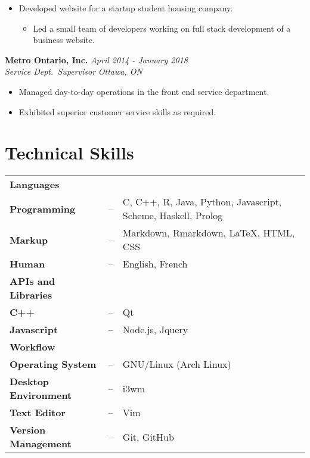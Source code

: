 \documentclass[]{article}
\providecommand{\tightlist}{%
  \setlength{\itemsep}{0pt}\setlength{\parskip}{0pt}}
\begin{document}
\begin{itemize}
\tightlist
\item
  Developed website for a startup student housing company.

  \begin{itemize}
  \tightlist
  \item
    Led a small team of developers working on full stack development of
    a business website.
  \end{itemize}
\end{itemize}

\textbf{Metro Ontario, Inc.}
\hfill\hfill \emph{April 2014 - January 2018}\\
\emph{Service Dept.~Supervisor} \hfill\hfill \emph{Ottawa, ON}

\begin{itemize}
\tightlist
\item
  Managed day-to-day operations in the front end service department.
\item
  Exhibited superior customer service skills as required.
\end{itemize}

\hypertarget{technical-skills}{%
\section{Technical Skills}\label{technical-skills}}

\begin{tabular}{l c l}
  {\hspace{-1.5em} \bfseries \large Languages} &&\\
  \bfseries
  Programming   &--& C, C++, R, Java, Python, Javascript, Scheme, Haskell, Prolog\\
  \bfseries
  Markup        &--& Markdown, Rmarkdown, \LaTeX, HTML, CSS\\
  \bfseries
  Human         &--& English, French\vspace{0.5em}\\
  {\hspace{-1.5em} \bfseries \large APIs and Libraries} &&\\
  \bfseries
  C++           &--& Qt\\
  \bfseries
  Javascript    &--& Node.js, Jquery\vspace{0.5em}\\
  {\hspace{-1.5em} \bfseries \large Workflow} &&\\
  \bfseries
  Operating System    &--& GNU/Linux (Arch Linux)\\
  \bfseries
  Desktop Environment &--& i3wm\\
  \bfseries
  Text Editor         &--& Vim\\
  \bfseries
  Version Management  &--& Git, GitHub
\end{tabular}
\end{document}
